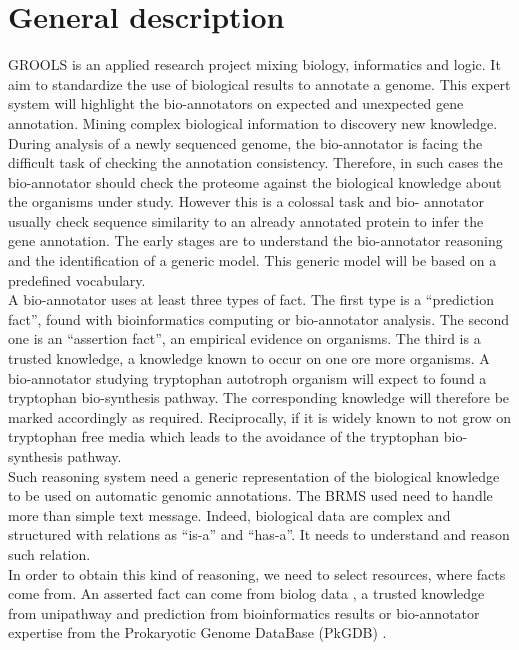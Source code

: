 \documentclass{llncs}
\begin{document}
\section{General description}
GROOLS is an applied research project mixing  biology, informatics and logic. It aim to standardize the use of biological results to annotate a genome. This expert system will highlight the bio-annotators on expected and unexpected gene annotation. Mining complex biological information to discovery new knowledge.\\
During analysis of a newly sequenced genome, the bio-annotator is facing the difficult task of checking the annotation consistency. Therefore, in such cases the bio-annotator should check the proteome against the biological knowledge about the organisms under study. However this is a colossal task and bio- annotator usually check sequence similarity to an already annotated protein to infer the gene annotation. The early stages are to understand the bio-annotator reasoning and the identification of a generic model. This generic model will be based on a predefined vocabulary.\\
A bio-annotator uses at least three types of fact. The first type is a ``prediction fact'', found with bioinformatics computing or bio-annotator analysis. The second one is an ``assertion fact'', an empirical evidence on organisms. The third is a trusted knowledge, a knowledge known to occur on one ore more organisms. A bio-annotator studying tryptophan autotroph organism will expect to found a tryptophan bio-synthesis pathway. The corresponding knowledge will therefore be marked accordingly as required. Reciprocally, if it is widely known to not grow on tryptophan free media which leads to the avoidance of the tryptophan bio-synthesis pathway. \\
Such reasoning system need a generic representation of the biological knowledge to be used on automatic genomic annotations. The BRMS used need to handle more than simple text message. Indeed, biological data are complex and structured with relations as ``is-a'' and ``has-a''. It needs to understand and reason such relation. \\
In order to obtain this kind of reasoning, we need to select resources, where facts come from. An asserted fact can come from biolog data \cite{biolog}, a trusted knowledge from unipathway \cite{morgat2011unipathway} and prediction from bioinformatics results or bio-annotator expertise from the Prokaryotic Genome DataBase (PkGDB) \cite{vallenet2012microscope}. \\
\end{document}
